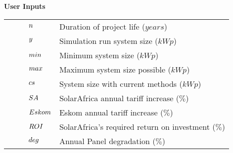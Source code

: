 \documentclass[a4paper,11pt,fleqn]{report}
\begin{document}
\textbf{User Inputs}\\
\newenvironment{conditions}
  {\par\vspace{\abovedisplayskip}\noindent\begin{tabular}{>{$}l<{$} @{${}={}$} l}}
  {\end{tabular}\par\vspace{\belowdisplayskip}}
\begin{conditions}
\indent\indent n & Duration of project life ($years$)\\   
\indent\indent y & Simulation run system size ($kWp$)\\
\indent\indent min & Minimum system size ($kWp$)\\
\indent\indent max & Maximum system size possible ($kWp$)\\
\indent\indent cs & System size with current methods ($kWp$)\\
\indent\indent SA & SolarAfrica annual tariff increase ($\%$)\\
\indent\indent Eskom & Eskom annual tariff increase ($\%$)\\
\indent\indent ROI & SolarAfrica's required return on investment ($\%$)\\
\indent\indent deg & Annual Panel degradation ($\%$)
\end{conditions}


 
\end{document}
